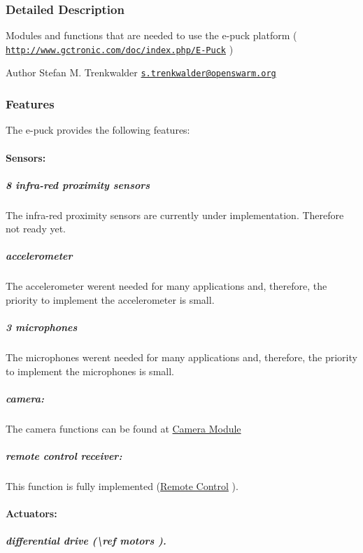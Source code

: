 \subsubsection{Detailed Description}
Modules and functions that are needed to use the e-\/puck platform ( \href{http://www.gctronic.com/doc/index.php/E-Puck}{\tt http\+://www.\+gctronic.\+com/doc/index.\+php/\+E-\/\+Puck} ) 

\begin{DoxyAuthor}{Author}
Stefan M. Trenkwalder \href{mailto:s.trenkwalder@openswarm.org}{\tt s.\+trenkwalder@openswarm.\+org}
\end{DoxyAuthor}
\hypertarget{group__epuck_Provided}{}\subsubsection{Features}\label{group__epuck_Provided}
The e-\/puck provides the following features\+: \hypertarget{group__epuck_epuck_sensor}{}\paragraph{Sensors\+:}\label{group__epuck_epuck_sensor}
\hypertarget{group__epuck_epuck_prox}{}\subparagraph{8 infra-\/red proximity sensors}\label{group__epuck_epuck_prox}
The infra-\/red proximity sensors are currently under implementation. Therefore not ready yet. \hypertarget{group__epuck_epuck_acc}{}\subparagraph{accelerometer}\label{group__epuck_epuck_acc}
The accelerometer weren\textquotesingle{}t needed for many applications and, therefore, the priority to implement the accelerometer is small. \hypertarget{group__epuck_epuck_mic}{}\subparagraph{3 microphones}\label{group__epuck_epuck_mic}
The microphones weren\textquotesingle{}t needed for many applications and, therefore, the priority to implement the microphones is small. \hypertarget{group__epuck_epuck_camera}{}\subparagraph{camera\+:}\label{group__epuck_epuck_camera}
The camera functions can be found at \hyperlink{group__camera}{Camera Module} \hypertarget{group__epuck_epuck_remote}{}\subparagraph{remote control receiver\+:}\label{group__epuck_epuck_remote}
This function is fully implemented (\hyperlink{group__remotecontrol}{Remote Control} ). \hypertarget{group__epuck_epuck_output}{}\paragraph{Actuators\+:}\label{group__epuck_epuck_output}
\hypertarget{group__epuck_epuck_motors}{}\subparagraph{differential drive (\textbackslash{}ref motors ).}\label{group__epuck_epuck_motors}

